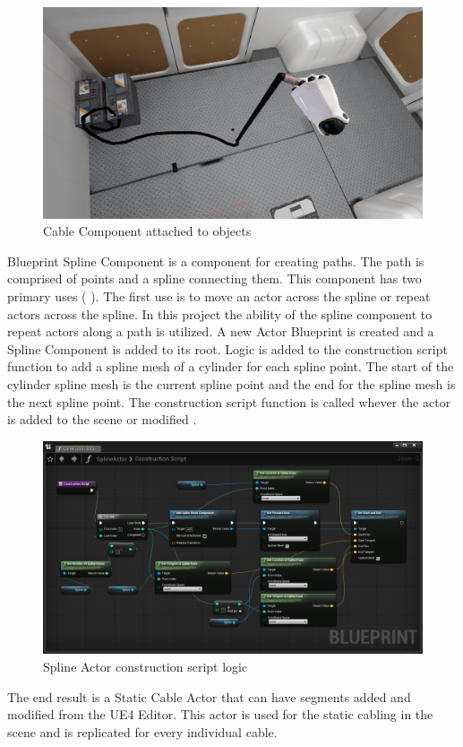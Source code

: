 \documentclass[12pt, a4paper,oneside, nocenter]{thesis}
\newcommand{\citeyeartitlexamkinline}[1]{(\usebibentry{#1}{title} \citeyear{#1})}
\begin{document}
\begin{figure}[H]
	\includegraphics[width=\textwidth]{cable-grab}
	\caption{Cable Component attached to objects}
	\label{fig:cable-grab}
\end{figure}
Blueprint Spline Component is a component for creating paths. The path is comprised of points and a spline connecting them. This component has two primary uses \citeyeartitlexamkinline{spline-component}. The first use is to move an actor across the spline or repeat actors across the spline. In this project the ability of the spline component to repeat actors along a path is utilized. A new Actor Blueprint is created and a Spline Component is added to its root. Logic is added to the construction script function to add a spline mesh of a cylinder for each spline point. The start of the cylinder spline mesh is the current spline point and the end for the spline mesh is the next spline point. The construction script function is called whever the actor is added to the scene or modified . 
\begin{figure}[H]
	\includegraphics[width=\textwidth]{spline-component}
	\caption{Spline Actor construction script logic}
	\label{fig:spline-component}
\end{figure}
The end result is a Static Cable Actor that can have segments added and modified from the UE4 Editor. This actor is used for the static cabling in the scene and is replicated for every individual cable.
\end{document}

